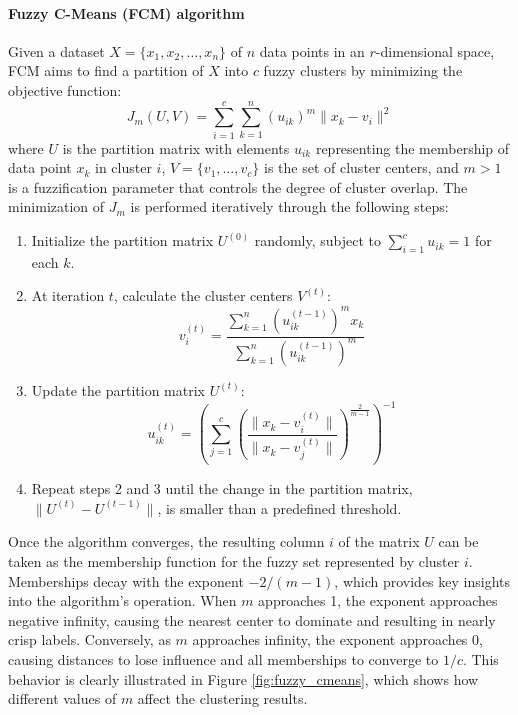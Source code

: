 \paragraph{Fuzzy C-Means (FCM) algorithm} Given a dataset $X = \{x_1, x_2, \ldots, x_n\}$ of $n$ data points in an $r$-dimensional space, FCM aims to find a partition of $X$ into $c$ fuzzy clusters by minimizing the objective function:
\[
J_m(U, V) = \sum_{i=1}^{c} \sum_{k=1}^{n} (u_{ik})^m \|x_k - v_i\|^2
\]
where $U$ is the partition matrix with elements $u_{ik}$ representing the membership of data point $x_k$ in cluster $i$, $V = \{v_1, \ldots, v_c\}$ is the set of cluster centers, and $m > 1$ is a fuzzification parameter that controls the degree of cluster overlap. The minimization of $J_m$ is performed iteratively through the following steps:
\begin{enumerate}
    \item Initialize the partition matrix $U^{(0)}$ randomly, subject to $\sum_{i=1}^{c} u_{ik} = 1$ for each $k$.
    \item At iteration $t$, calculate the cluster centers $V^{(t)}$:
    \[
    v_i^{(t)} = \frac{\sum_{k=1}^{n} (u_{ik}^{(t-1)})^m x_k}{\sum_{k=1}^{n} (u_{ik}^{(t-1)})^m}
    \]
    \item Update the partition matrix $U^{(t)}$:
    \[
    u_{ik}^{(t)} = \left( \sum_{j=1}^{c} \left( \frac{\|x_k - v_i^{(t)}\|}{\|x_k - v_j^{(t)}\|} \right)^{\frac{2}{m-1}} \right)^{-1}
    \]
    \item Repeat steps 2 and 3 until the change in the partition matrix, $\|U^{(t)} - U^{(t-1)}\|$, is smaller than a predefined threshold.
\end{enumerate}
Once the algorithm converges, the resulting column $i$ of the matrix $U$ can be taken as the membership function for the fuzzy set represented by cluster $i$.\\

Memberships decay with the exponent ${-2/(m-1)}$, which provides key insights into the algorithm's operation. When $m$ approaches 1, the exponent approaches negative infinity, causing the nearest center to dominate and resulting in nearly crisp labels. Conversely, as $m$ approaches infinity, the exponent approaches 0, causing distances to lose influence and all memberships to converge to $1/c$. This behavior is clearly illustrated in Figure \ref{fig:fuzzy_cmeans}, which shows how different values of $m$ affect the clustering results.

